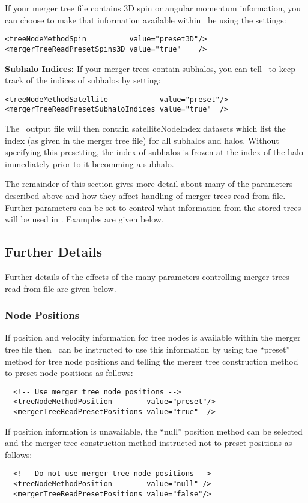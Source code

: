 If your merger tree file contains 3D spin or angular momentum information, you can choose to make that information available within \glc\ be using the settings:
\begin{verbatim}
<treeNodeMethodSpin          value="preset3D"/>
<mergerTreeReadPresetSpins3D value="true"    />
\end{verbatim}

{\bf Subhalo Indices:} If your merger trees contain subhalos, you can tell \glc\ to keep track of the indices of subhalos by setting:
\begin{verbatim}
<treeNodeMethodSatellite            value="preset"/>
<mergerTreeReadPresetSubhaloIndices value="true"  />
\end{verbatim}
The \glc\ output file will then contain {\normalfont \ttfamily satelliteNodeIndex} datasets which list the index (as given in the merger tree file) for all subhalos and halos. Without specifying this presetting, the index of subhalos is frozen at the index of the halo immediately prior to it becomming a subhalo.

The remainder of this section gives more detail about many of the parameters described above and how they affect handling of merger trees read from file. Further parameters can be set to control what information from the stored trees will be used in \glc. Examples are given below.

\subsection{Further Details}

Further details of the effects of the many parameters controlling merger trees read from file are given below.

\subsubsection{Node Positions}

If position and velocity information for tree nodes is available within the merger tree file then \glc\ can be instructed to use this information by using the ``preset'' method for tree node positions and telling the merger tree construction method to preset node positions as follows:
\begin{verbatim}
  <!-- Use merger tree node positions -->
  <treeNodeMethodPosition        value="preset"/>
  <mergerTreeReadPresetPositions value="true"  />
\end{verbatim}
If position information is unavailable, the ``null'' position method can be selected and the merger tree construction method instructed not to preset positions as follows:
\begin{verbatim}
  <!-- Do not use merger tree node positions -->
  <treeNodeMethodPosition        value="null" />
  <mergerTreeReadPresetPositions value="false"/>
\end{verbatim}

